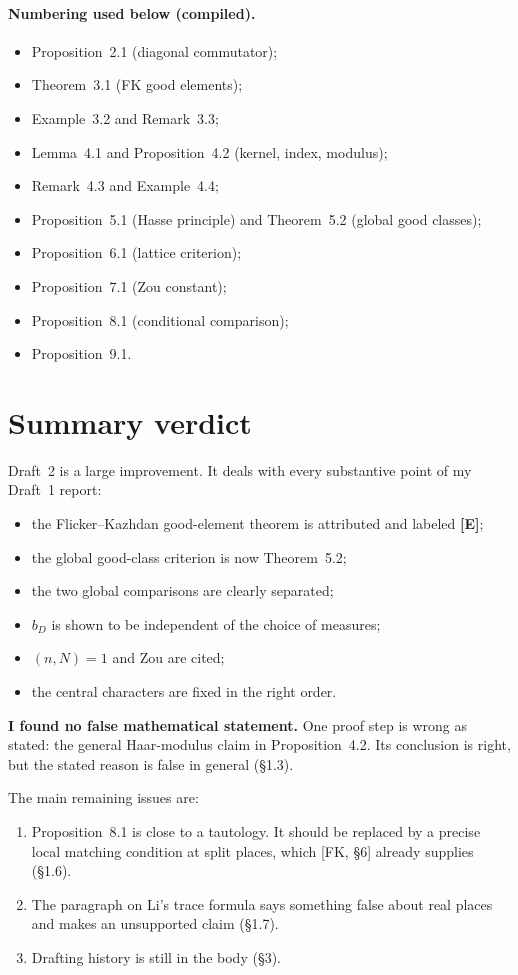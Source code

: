 \documentclass[11pt]{article}
\begin{document}
\paragraph{Numbering used below (compiled).}
\begin{itemize}
\item Proposition~2.1 (diagonal commutator);
\item Theorem~3.1 (FK good elements);
\item Example~3.2 and Remark~3.3;
\item Lemma~4.1 and Proposition~4.2 (kernel, index, modulus);
\item Remark~4.3 and Example~4.4;
\item Proposition~5.1 (Hasse principle) and Theorem~5.2 (global good classes);
\item Proposition~6.1 (lattice criterion);
\item Proposition~7.1 (Zou constant);
\item Proposition~8.1 (conditional comparison);
\item Proposition~9.1.
\end{itemize}

\section*{Summary verdict}
Draft~2 is a large improvement. It deals with every substantive point of
my Draft~1 report:
\begin{itemize}
\item the Flicker--Kazhdan good-element theorem is attributed and labeled
\textbf{[E]};
\item the global good-class criterion is now Theorem~5.2;
\item the two global comparisons are clearly separated;
\item $b_D$ is shown to be independent of the choice of measures;
\item $(n,N)=1$ and Zou are cited;
\item the central characters are fixed in the right order.
\end{itemize}

\textbf{I found no false mathematical statement.} One proof step is
wrong as stated: the general Haar-modulus claim in Proposition~4.2. Its
conclusion is right, but the stated reason is false in general (\S1.3).

The main remaining issues are:
\begin{enumerate}[label=(\arabic*)]
\item Proposition~8.1 is close to a tautology. It should be replaced by a
precise local matching condition at split places, which [FK, \S6]
already supplies (\S1.6).
\item The paragraph on Li's trace formula says something false about real
places and makes an unsupported claim (\S1.7).
\item Drafting history is still in the body (\S3).
\end{enumerate}
\end{document}

